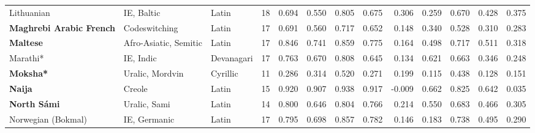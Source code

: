 \begin{tabular}{lllrrrrrrrrrr}
                     Lithuanian &                      IE, Baltic &                 Latin &        18 &                       0.694 &                         0.550 &         0.805 &                  0.675 &            0.306 &                         0.259 &         0.670 &                  0.428 &            0.375 \\
\textbf{Maghrebi Arabic French} &                   Codeswitching &                 Latin &        17 &                       0.691 &                         0.560 &         0.717 &                  0.652 &            0.148 &                         0.340 &         0.528 &                  0.310 &            0.283 \\
               \textbf{Maltese} &           Afro-Asiatic, Semitic &                 Latin &        17 &                       0.846 &                         0.741 &         0.859 &                  0.775 &            0.164 &                         0.498 &         0.717 &                  0.511 &            0.318 \\
                       Marathi* &                       IE, Indic &            Devanagari &        17 &                       0.763 &                         0.670 &         0.808 &                  0.645 &            0.134 &                         0.621 &         0.663 &                  0.346 &            0.248 \\
               \textbf{Moksha*} &                 Uralic, Mordvin &              Cyrillic &        11 &                       0.286 &                         0.314 &         0.520 &                  0.271 &            0.199 &                         0.115 &         0.438 &                  0.128 &            0.151 \\
                 \textbf{Naija} &                          Creole &                 Latin &        15 &                       0.920 &                         0.907 &         0.938 &                  0.917 &           -0.009 &                         0.662 &         0.825 &                  0.642 &            0.035 \\
            \textbf{North Sámi} &                    Uralic, Sami &                 Latin &        14 &                       0.800 &                         0.646 &         0.804 &                  0.766 &            0.214 &                         0.550 &         0.683 &                  0.466 &            0.305 \\
             Norwegian (Bokmal) &                    IE, Germanic &                 Latin &        17 &                       0.795 &                         0.698 &         0.857 &                  0.782 &            0.146 &                         0.183 &         0.738 &                  0.495 &            0.290 \\

\end{tabular}
